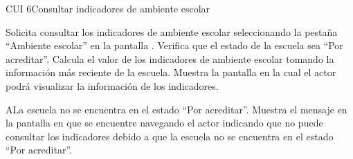 \begin{UseCase}{CUI 6}{Consultar indicadores de ambiente escolar}
{	}
	



	

	
\end{UseCase}
 \begin{UCtrayectoria}
    \UCpaso[\UCactor] Solicita consultar los indicadores de ambiente escolar seleccionando la pestaña ``Ambiente escolar'' en la pantalla .
    \UCpaso[\UCsist] Verifica que el estado de la escuela sea ``Por acreditar''.   
    \UCpaso[\UCsist] Calcula el valor de los indicadores de  ambiente escolar tomando la información más reciente de la escuela.%
    \UCpaso[\UCsist] Muestra la pantalla  en la cual el actor podrá visualizar la información de los indicadores.
\end{UCtrayectoria}
 
 \begin{UCtrayectoriaA}{A}{La escuela no se encuentra en el estado ``Por acreditar''.}
    \UCpaso[\UCsist] Muestra el mensaje  en la pantalla en que se encuentre navegando el
    actor indicando que no puede consultar los indicadores debido a que la escuela no se encuentra en el estado ``Por acreditar''. 
 \end{UCtrayectoriaA}


